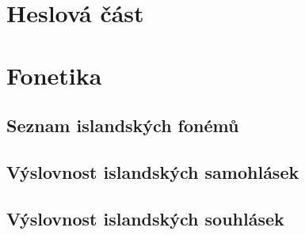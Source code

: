 \fi


\chapter{Heslová část}



\clearpage


\ifinputletters

\cleardoublepage

\dictionarygeometry
\pagestyle{myheadings}





\restoregeometry
\pagestyle{plain}

\fi


\ifinputphon

\cleardoublepage

\chapter{Fonetika}                               \label{sec:phon}

\section{Seznam islandských fonémů}              \label{sec:phon_phonems}

\clearpage

\section{Výslovnost islandských samohlásek}      \label{sec:phon_vowels}
\clearpage

\section{Výslovnost islandských souhlásek}       \label{sec:phon_consonants}

